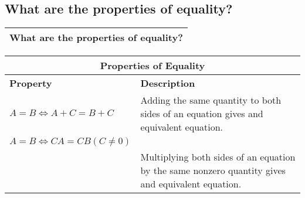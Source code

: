 \subsection{What are the properties of equality?}
\begin{small}
    \begin{tabularx}{1\textwidth}{
            p{}
        }
        \toprule
            What are the properties of equality?
        \\
        \bottomrule
    \end{tabularx}
\end{small}
\begin{small}
    \begin{tabularx}{1\textwidth}{
            p{}
            p{}
        }
        \toprule
        \multicolumn{2}{c}{\textbf{Properties of Equality}} 
        \\
        \midrule
        \textbf{Property} & \textbf{Description}
        \\
        \midrule

        $ A = B \iff A + C = B + C $
        &
        Adding the same quantity to both sides of an equation gives and
        equivalent equation.
        \\
        \midrule

        $ A = B \iff CA = CB (C \neq 0) $
        \\
        &
        Multiplying both sides of an equation by the same nonzero quantity gives
        and equivalent equation.
        \\
        \bottomrule
    \end{tabularx}
\end{small}
